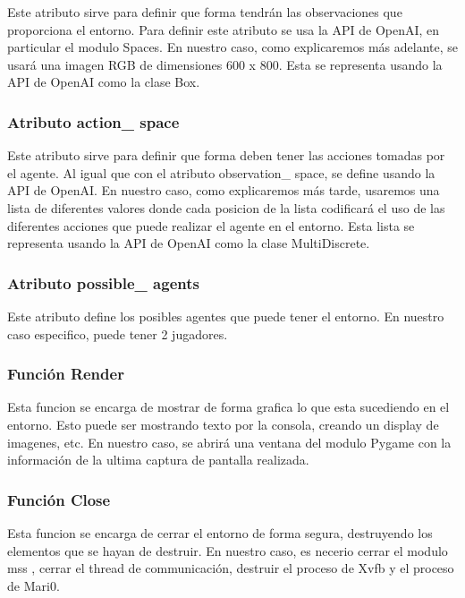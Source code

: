 Este atributo sirve para definir que forma tendrán las observaciones que proporciona el entorno. Para definir este atributo se usa la API de OpenAI, en particular el modulo Spaces. En nuestro caso, como explicaremos más adelante, se usará una imagen RGB de dimensiones 600 x 800. Esta se representa usando la API de OpenAI como la clase Box.

\subsubsection*{Atributo action\_ space}

Este atributo sirve para definir que forma deben tener las acciones tomadas por el agente. Al igual que con el atributo observation\_ space, se define usando la API de OpenAI. En nuestro caso, como explicaremos más tarde, usaremos una lista de diferentes valores donde cada posicion de la lista codificará el uso de las diferentes acciones que puede realizar el agente en el entorno. Esta lista se representa usando la API de OpenAI como la clase MultiDiscrete.

\subsubsection*{Atributo possible\_ agents}

Este atributo define los posibles agentes que puede tener el entorno. En nuestro caso especifico, puede tener 2 jugadores.

\subsubsection*{Función Render}

Esta funcion se encarga de mostrar de forma grafica lo que esta sucediendo en el entorno. Esto puede ser mostrando texto por la consola, creando un display de imagenes, etc. En nuestro caso, se abrirá una ventana del modulo Pygame \cite {pygame} con la información de la ultima captura de pantalla realizada.

\subsubsection*{Función Close}

Esta funcion se encarga de cerrar el entorno de forma segura, destruyendo los elementos que se hayan de destruir. En nuestro caso, es necerio cerrar el modulo mss \cite {mss}, cerrar el thread de communicación, destruir el proceso de Xvfb \cite {xvfb} y el proceso de Mari0.

